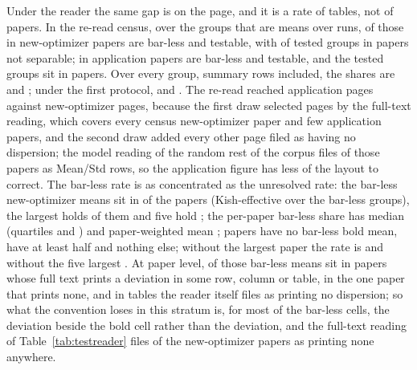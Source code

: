 \documentclass[preprint,review,12pt]{elsarticle}
\begin{document}
Under the reader the same gap is on the page, and it is a rate of tables, not of papers. In the re-read census, over the groups that are means over runs, \nCrcMeansNewOptimizerNeither{} \nCrcMeansNewOptimizerNeitherCi{} of those in new-optimizer papers are bar-less and \nCrcMeansNewOptimizerTestable{} testable, with \nCrcMeansNewOptimizerFail{} \nCrcMeansNewOptimizerFailCi{} of \nCrcMeansNewOptimizerTested{} tested groups in \nCrcMeansNewOptimizerTestedPapers{} papers not separable; in application papers \nCrcMeansApplicationNeither{} \nCrcMeansApplicationNeitherCi{} are bar-less and \nCrcMeansApplicationTestable{} testable, and the \nCrcMeansApplicationTested{} tested groups sit in \nCrcMeansApplicationTestedPapers{} papers. Over every group, summary rows included, the shares are \nCrcNewOptimizerNeither{} and \nCrcApplicationNeither{}; under the first protocol, \nCrNewOptimizerNeither{} and \nCrApplicationNeither{}. The re-read reached \nCrrrPagesApplication{} application pages against \nCrrrPagesNewOptimizer{} new-optimizer pages, because the first draw selected pages by the full-text reading, which covers every census new-optimizer paper and few application papers, and the second draw added every other page filed as having no dispersion; the model reading of the random rest of the corpus files \nTrRandomOtherLayoutSeparateRowPct{} of those papers as Mean/Std rows, so the application figure has less of the layout to correct. The bar-less rate is as concentrated as the unresolved rate: the \nCrcPbNewOptimizerHits{} bar-less new-optimizer means sit in \nCrcPbNewOptimizerPapersWithHits{} of the \nCrcPbNewOptimizerPapers{} papers (Kish-effective \nCrcPbNewOptimizerEffectivePapersHits{} over the bar-less groups), the largest holds \nCrcPbNewOptimizerLargestShare{} of them and five hold \nCrcPbNewOptimizerTopFiveShare{}; the per-paper bar-less share has median \nCrcPbNewOptimizerMedianRate{} (quartiles \nCrcPbNewOptimizerQORate{} and \nCrcPbNewOptimizerQTRate{}) and paper-weighted mean \nCrcPbNewOptimizerMacroRate{} \nCrcPbNewOptimizerMacroRateCi{}; \nCrcPbNewOptimizerPapersAtZero{} papers have no bar-less bold mean, \nCrcPbNewOptimizerPapersAtLeastHalf{} have at least half and \nCrcPbNewOptimizerPapersAtHundred{} nothing else; without the largest paper the rate is \nCrcPbNewOptimizerWithoutLargestPct{} and without the five largest \nCrcPbNewOptimizerWithoutTopFivePct{}. At paper level, \nCrcPbNewOptimizerInPapersPrintingADeviationSomewhere{} of those bar-less means sit in papers whose full text prints a deviation in some row, column or table, \nCrcPbNewOptimizerInPapersPrintingNone{} in the one paper that prints none, and \nCrcPbNewOptimizerInTablesFiledNoBar{} in tables the reader itself files as printing no dispersion; so what the convention loses in this stratum is, for most of the bar-less cells, the deviation beside the bold cell rather than the deviation, and the full-text reading of Table~\ref{tab:testreader} files \nTrNewOptimizerLayoutNonePct{} of the new-optimizer papers as printing none anywhere.
\end{document}
